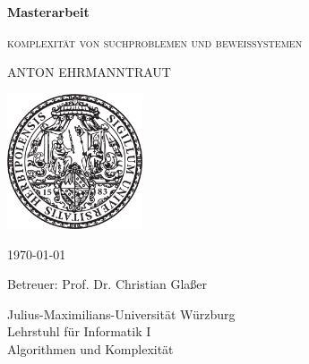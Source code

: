 \pagestyle{empty}

\begin{center}{

\vspace*{2cm}

{\large\textbf{Masterarbeit}}\par
    \vspace*{1cm}
{\LARGE\textsc{komplexität von suchproblemen und beweissystemen}}\par
    \vspace*{.3cm}
{\large\textsc{ANTON EHRMANNTRAUT}}\par}
\vspace*{5cm}

\includegraphics[width=4cm]{siegel.pdf}

\vspace*{2cm}


{\large\today}\vspace*{.9cm}

{\large Betreuer: Prof. Dr. Christian Glaßer}\vspace*{.5cm}


{\large
Julius-Maximilians-Universität Würzburg\\
Lehrstuhl für Informatik I\\
Algorithmen und Komplexität\\
}


\end{center}

\cleardoublepage
\restoregeometry

\tableofcontents
\thispagestyle{empty}
\cleardoublepage
{}
\pagestyle{main}

